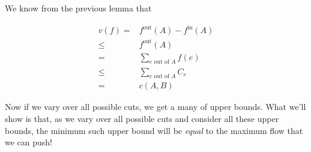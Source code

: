 \documentclass[12pt]{article}
\begin{document}
  {
    We know from the previous lemma that

    \begin{align*}
      v(f) =&f^\text{out}(A) - f^\text{in}(A) \\
         \le&f^\text{out}(A) \\
           =& \sum_{e \text{ out of } A} f(e) \\
           \le&\sum_{e \text{ out of } A} C_e \\
           =&c(A, B)
    \end{align*}
  }

  Now if we vary over all possible cuts, we get a many of upper bounds. What
  we'll show is that, as we vary over all possible cuts and consider all these
  upper bounds, the minimum such upper bound will be {\it equal} to the maximum
  flow that we can push!
\end{document}
